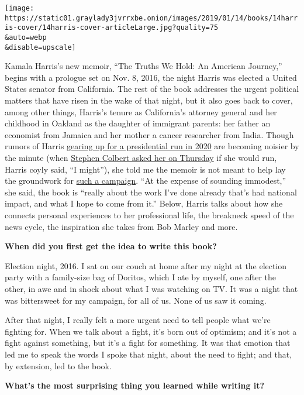 \texttt{[image: https://static01.graylady3jvrrxbe.onion/images/2019/01/14/books/14harris-cover/14harris-cover-articleLarge.jpg?quality=75\\\&auto=webp\\\&disable=upscale]}

Kamala Harris's new memoir, ``The Truths We Hold: An American Journey,''
begins with a prologue set on Nov. 8, 2016, the night Harris was elected
a United States senator from California. The rest of the book addresses
the urgent political matters that have risen in the wake of that night,
but it also goes back to cover, among other things, Harris's tenure as
California's attorney general and her childhood in Oakland as the
daughter of immigrant parents: her father an economist from Jamaica and
her mother a cancer researcher from India. Though rumors of Harris
\href{https://www.nytimes3xbfgragh.onion/2019/01/12/us/politics/kamala-harris-democrats.html}{gearing
up for a presidential run in 2020} are becoming noisier by the minute
(when
\href{https://www.facebookcorewwwi.onion/colbertlateshow/videos/374316359794531/}{Stephen
Colbert asked her on Thursday} if she would run, Harris coyly said, ``I
might''), she told me the memoir is not meant to help lay the groundwork
for
\href{https://www.nytimes3xbfgragh.onion/2018/12/29/us/politics/2020-democratic-candidates-kamala-elizabeth-warren.html}{such
a campaign}. ``At the expense of sounding immodest,'' she said, the book
is ``really about the work I've done already that's had national impact,
and what I hope to come from it.'' Below, Harris talks about how she
connects personal experiences to her professional life, the breakneck
speed of the news cycle, the inspiration she takes from Bob Marley and
more.

\textbf{When did you first get the idea to write this book?}

Election night, 2016. I sat on our couch at home after my night at the
election party with a family-size bag of Doritos, which I ate by myself,
one after the other, in awe and in shock about what I was watching on
TV. It was a night that was bittersweet for my campaign, for all of us.
None of us saw it coming.

After that night, I really felt a more urgent need to tell people what
we're fighting for. When we talk about a fight, it's born out of
optimism; and it's not a fight against something, but it's a fight for
something. It was that emotion that led me to speak the words I spoke
that night, about the need to fight; and that, by extension, led to the
book.

\textbf{What's the most surprising thing you learned while writing it?}

